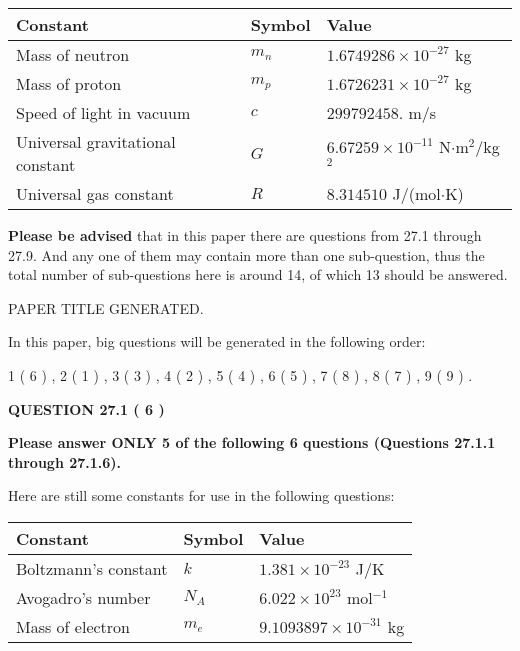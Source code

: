 \documentclass[12pt]{article}
\begin{document}
 
\noindent\begin{tabular}{|l|l|l|}
\hline
Constant & Symbol & Value \\
\hline
Mass of neutron &
$m_n$ &
 $ 1.6749286 \times 10^{-27} $
kg \\
\hline
Mass of proton &
$m_p$ &
 $ 1.6726231 \times 10^{-27} $
kg \\
\hline
Speed of light in vacuum &
$c$ &
 $ 299792458. $
m/s \\
\hline
Universal gravitational constant &
$G$ &
 $ 6.67259 \times 10^{-11} $
N$\cdot $m$^2$/kg$^2$ \\
\hline
Universal gas constant &
$R$ &
 $ 8.314510 $
J/(mol$\cdot $K) \\
\hline
\end{tabular}
 
 
{\textbf{\large{Please be advised}}} that in this paper there are questions from
27.1 through
27.9.
And any one of them may contain more than one sub-question, thus the total number
of sub-questions here is around 14, of which
13 should be answered.
 
\vspace{0.3in}
 
 
   
   
 PAPER TITLE GENERATED.
   
   
   
\vspace{0.2in}
   
In this paper, big questions will be generated in the following order: 
   
   
             1 (           6 )
 ,
             2 (           1 )
 ,
             3 (           3 )
 ,
             4 (           2 )
 ,
             5 (           4 )
 ,
             6 (           5 )
 ,
             7 (           8 )
 ,
             8 (           7 )
 ,
             9 (           9 )
 .
  
\vspace{0.2in}
  
{\textbf{\Large{QUESTION
27.1 
 (           6 )
}}}
  
  
 
{\textbf{\Large{Please answer ONLY
5 of the following
6 questions (Questions
27.1.1 through
27.1.6). }}}
 
Here are still some constants for use in the following questions:
 
 
\noindent\begin{tabular}{|l|l|l|}
\hline
Constant & Symbol & Value \\
\hline
 
Boltzmann's constant &
$k$ &
 $ 1.381 \times 10^{-23} $
J/K \\
\hline
 
Avogadro's number &
$N_A$ &
 $ 6.022 \times 10^{23} $
mol$^{-1}$ \\
\hline
 
Mass of electron &
$m_e$ &
 $ 9.1093897 \times 10^{-31} $
kg \\
\hline
 
\end{tabular}
 
\end{document}
